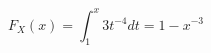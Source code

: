 \documentclass[10pt]{article}
\begin{document}
\begin{itemize}
\begin{enumerate}
        \[ 
          F_{X}(x) = \int_{1}^{x} 3t^{-4} d{t} = 1 - x^{-3}
        \]
    \end{enumerate}

\end{itemize}
\end{document}
